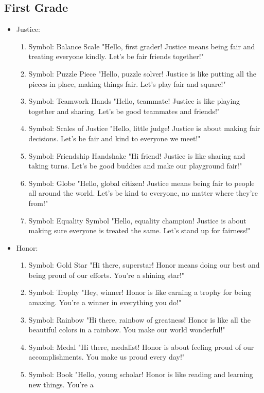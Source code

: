 \documentclass[11pt]{article}
\begin{document}
\subsection{First Grade}
\label{sec:orga9a3ef4}
\begin{itemize}
\item Justice:
\begin{enumerate}
\item Symbol: Balance Scale
"Hello, first grader! Justice means being fair and treating everyone kindly. Let's
be fair friends together!"
\item Symbol: Puzzle Piece
"Hello, puzzle solver! Justice is like putting all the pieces in place, making
things fair. Let's play fair and square!"
\item Symbol: Teamwork Hands
"Hello, teammate! Justice is like playing together and sharing. Let's be good
teammates and friends!"
\item Symbol: Scales of Justice
"Hello, little judge! Justice is about making fair decisions. Let's be fair and
kind to everyone we meet!"
\item Symbol: Friendship Handshake
"Hi friend! Justice is like sharing and taking turns. Let's be good buddies and
make our playground fair!"
\item Symbol: Globe
"Hello, global citizen! Justice means being fair to people all around the world.
Let's be kind to everyone, no matter where they're from!"
\item Symbol: Equality Symbol
"Hello, equality champion! Justice is about making sure everyone is treated the
same. Let's stand up for fairness!"
\end{enumerate}
\item Honor:
\begin{enumerate}
\item Symbol: Gold Star
"Hi there, superstar! Honor means doing our best and being proud of our efforts.
You're a shining star!"
\item Symbol: Trophy
"Hey, winner! Honor is like earning a trophy for being amazing. You're a winner in
everything you do!"
\item Symbol: Rainbow
"Hi there, rainbow of greatness! Honor is like all the beautiful colors in a
rainbow. You make our world wonderful!"
\item Symbol: Medal
"Hi there, medalist! Honor is about feeling proud of our accomplishments. You make
us proud every day!"
\item Symbol: Book
"Hello, young scholar! Honor is like reading and learning new things. You're a

\end{enumerate}
\end{itemize}
\end{document}
